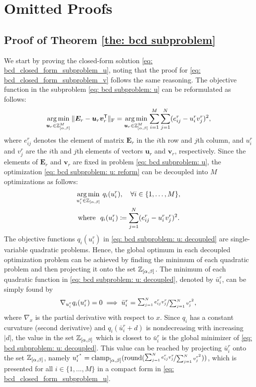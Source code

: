 
\section{Omitted Proofs}
\subsection{Proof of Theorem \ref{the: bcd subproblem}} \label{app: monotonicity proof}
We start by proving the closed-form solution \eqref{eq: bcd_closed_form_subproblem_u}, noting that the proof for \eqref{eq: bcd_closed_form_subproblem_v} follows the same reasoning.
The objective function in the subproblem \eqref{eq: bcd subproblem: u} can be reformulated as follows:
\begin{align}
    \operatorname*{arg\,min}_{\bm{u}_r \in \mathbb Z_{[\alpha,\beta]}^M} \|\bm{E}_r - \bm{u}_r \bm{v}_r^\mathsf{T}\|_{\rm F} 
    = \operatorname*{arg\,min}_{\bm{u}_r \in \mathbb Z_{[\alpha,\beta]}^M}\sum_{i=1}^M \sum_{j=1}^N (e_{ij}^r - u_i^r v_j^r)^2,
    \label{eq: bcd subproblem: u: reform}
\end{align}
where $e_{ij}^r$ denotes the element of matrix $\bm{E}_r$ in the $i$th row and $j$th column, and $u_i^r$ and $v_j^r$ are the $i$th and $j$th elements of vectors $\bm{u}_r$ and $\bm{v}_r$, respectively. Since the elements of $\bm{E}_r$ and $\bm{v}_r$ are fixed in problem \eqref{eq: bcd subproblem: u}, the optimization \eqref{eq: bcd subproblem: u: reform} can be decoupled into $M$ optimizations as follows:
\begin{align}
    \operatorname*{arg\,min}_{u^r_i \in \mathbb Z_{[\alpha,\beta]}} & ~q_i(u_i^r), \quad \forall i\in\{1,\dots,M\}, \nonumber\\
    \textstyle \text{where} ~~ &q_i(u_i^r) \coloneqq \sum_{j=1}^N (e_{ij}^r - u_i^r v_j^r)^2.
    \label{eq: bcd subproblem: u: decoupled}
\end{align}
The objective functions $q_i(u_i^r)$ in \eqref{eq: bcd subproblem: u: decoupled} are single-variable quadratic problems. Hence, the global optimum in each decoupled optimization problem can be achieved by finding the minimum of each quadratic problem and then projecting it onto the set $\mathbb Z_{[\alpha,\beta]}$. The minimum of each quadratic function in \eqref{eq: bcd subproblem: u: decoupled}, denoted by $\bar{u}_i^r$, can be simply found by
\begin{align}
    \textstyle \nabla_{u_i^r} q_i(u_i^r) = 0 \implies \bar{u}_i^r = \nicefrac{\sum_{j=1}^N e_{ij}^r v_j^r}{\sum_{j=1}^N v_j^{r^2}},
    \label{eq: bcd subproblem: u: minimum}
\end{align}
where $\nabla_x$ is the partial derivative with respect to $x$.
Since $q_i$ has a constant curvature (second derivative) and $q_i(\bar{u}_i^r + d)$ is nondecreasing with increasing $|d|$, the value in the set $\mathbb Z_{[\alpha,\beta]}$ which is closest to $\bar{u}_i^r$ is the global minimizer of \eqref{eq: bcd subproblem: u: decoupled}. This value can be reached by projecting $\bar{u}_i^r$ onto the set $\mathbb Z_{[\alpha,\beta]}$, namely $u^{r^\star}_i = \operatorname{clamp}_{[\alpha,\beta]}(\operatorname{round}(\nicefrac{\sum_{j=1}^N e_{ij}^r v_j^r}{\sum_{j=1}^N v_j^{r^2}}))$, which is presented for all $i\in\{1,...,M\}$ in a compact form in \eqref{eq: bcd_closed_form_subproblem_u}.



